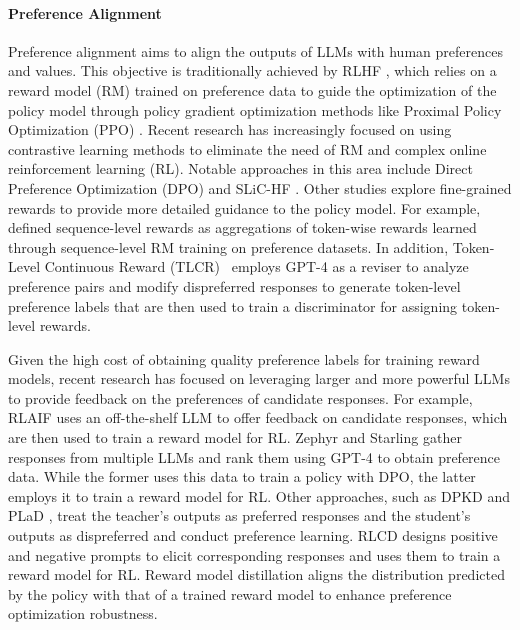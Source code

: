 \paragraph{Preference Alignment}
Preference alignment aims to align the outputs of LLMs with human preferences and values. This objective is traditionally achieved by RLHF \citep{ouyang2022training}, which relies on a reward model (RM) trained on preference data to guide the optimization of the policy model through policy gradient optimization methods like Proximal Policy Optimization (PPO) \citep{schulman2017proximal}. Recent research has increasingly focused on using contrastive learning methods to eliminate the need of RM and complex online reinforcement learning (RL). Notable approaches in this area include Direct Preference Optimization (DPO) \citep{rafailov2024direct} and SLiC-HF \citep{zhao2023slic}. Other studies explore fine-grained rewards to provide more detailed guidance to the policy model. For example, \citet{yang2024preference} defined sequence-level rewards as aggregations of token-wise rewards learned through sequence-level RM training on preference datasets. In addition, Token-Level Continuous Reward (TLCR)~\citep{yoon2024tlcr} employs GPT-4 as a reviser to analyze preference pairs and modify dispreferred responses to generate token-level preference labels that are then used to train a discriminator for assigning token-level rewards.



Given the high cost of obtaining quality preference labels for training reward models, recent research has focused on leveraging larger and more powerful LLMs to provide feedback on the preferences of candidate responses. For example, RLAIF \citep{lee2023rlaif} uses an off-the-shelf LLM to offer feedback on candidate responses, which are then used to train a reward model for RL. Zephyr \citep{tunstall2023zephyr} and Starling \citep{starling2023} gather responses from multiple LLMs and rank them using GPT-4 to obtain preference data. While the former uses this data to train a policy with DPO,  the latter employs it to train a reward model for RL. Other approaches, such as DPKD \citep{li2024direct} and PLaD \citep{zhang2024plad}, treat the teacher's outputs as preferred responses and the student's outputs as dispreferred and conduct preference learning. RLCD \citep{yang2023rlcd} designs positive and negative prompts to elicit corresponding responses and uses them to train a reward model for RL. Reward model distillation \citep{fisch2024robust} aligns the distribution predicted by the policy with that of a trained reward model to enhance preference optimization robustness.

\vspace{-0.5em}